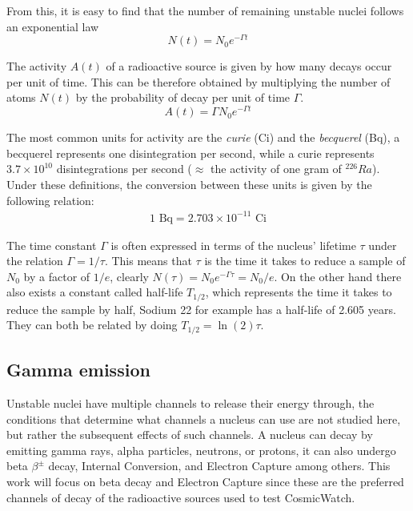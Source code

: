 From this, it is easy to find that the number of remaining unstable nuclei follows an exponential law
\begin{equation}
    N(t) = N_0 e^{-\Gamma t}
\end{equation}

The activity $A(t)$ of a radioactive source is given by how many decays occur per unit of time. This can be therefore obtained by multiplying the number of atoms $N(t)$ by the probability of decay per unit of time $\Gamma$.
\begin{equation}
    A(t) = \Gamma N_0 e^{-\Gamma t}
\end{equation}

The most common units for activity are the \textit{curie} (Ci) and the \textit{becquerel} (Bq), a becquerel represents one disintegration per second, while a curie represents $3.7\times10^{10}$ disintegrations per second ($\approx$ the activity of one gram of $^{226}Ra$). Under these definitions, the conversion between these units is given by the following relation:
\begin{eqnarray}
    1 \text{~Bq} = 2.703\times10^{-11} \text{~Ci}
\end{eqnarray}

The time constant $\Gamma$ is often expressed in terms of the nucleus' lifetime $\tau$ under the relation $\Gamma=1/\tau$. This means that $\tau$ is the time it takes to reduce a sample of $N_0$ by a factor of $1/e$, clearly $N(\tau)=N_0e^{-\Gamma \tau} = N_0/e$. On the other hand there also exists a constant called half-life $T_{1/2}$, which represents the time it takes to reduce the sample by half, Sodium 22 for example has a half-life of 2.605 years. They can both be related by doing $T_{1/2} = \ln (2)\tau$.

\subsection{Gamma emission}

Unstable nuclei have multiple channels to release their energy through, the conditions that determine what channels a nucleus can use are not studied here, but rather the subsequent effects of such channels. A nucleus can decay by emitting gamma rays, alpha particles, neutrons, or protons, it can also undergo beta $\beta^{\pm}$ decay, Internal Conversion, and Electron Capture among others. This work will focus on beta decay and Electron Capture since these are the preferred channels of decay of the radioactive sources used to test CosmicWatch.

